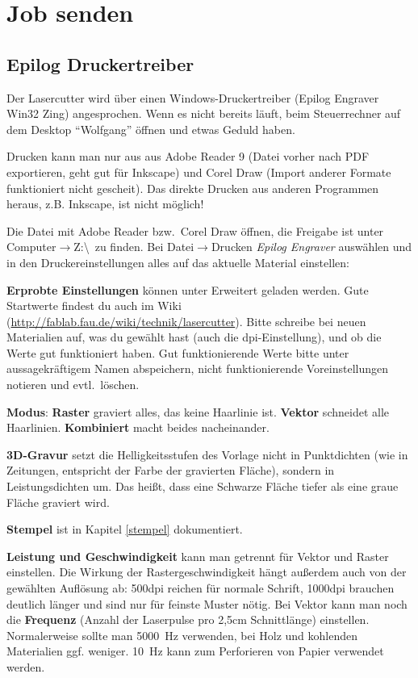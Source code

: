 \documentclass{\basedir/fablab-document}
\begin{document}
\section{Job senden}
\subsection{Epilog Druckertreiber}

Der Lasercutter wird über einen Windows-Druckertreiber (Epilog Engraver Win32 Zing) angesprochen. Wenn es nicht bereits läuft, beim Steuerrechner auf dem Desktop \enquote{Wolfgang} %
 öffnen und etwas Geduld haben. 

Drucken kann man nur aus aus Adobe Reader 9 (Datei vorher nach PDF exportieren, geht gut für Inkscape) und Corel Draw (Import anderer Formate funktioniert nicht gescheit).  Das direkte Drucken aus anderen Programmen heraus, z.B. Inkscape, ist nicht möglich! 

Die Datei mit Adobe Reader bzw.\  Corel Draw öffnen, die Freigabe ist unter Computer$\rightarrow$Z:\textbackslash \ zu finden. Bei Datei$\rightarrow$Drucken \textit{Epilog Engraver} auswählen und in den Druckereinstellungen alles auf das aktuelle Material einstellen:

\textbf{Erprobte Einstellungen} können unter Erweitert geladen werden. Gute Startwerte findest du auch im Wiki (\url{http://fablab.fau.de/wiki/technik/lasercutter}). Bitte schreibe bei neuen Materialien auf, was du gewählt hast (auch die dpi-Einstellung), und ob die Werte gut funktioniert haben. Gut funktionierende Werte bitte unter aussagekräftigem Namen abspeichern, nicht funktionierende Voreinstellungen notieren und evtl.\  löschen.

\textbf{Modus}: \textbf{Raster} graviert alles, das keine Haarlinie ist. \textbf{Vektor} schneidet alle Haarlinien. \textbf{Kombiniert} macht beides nacheinander.

\textbf{3D-Gravur} setzt die Helligkeitsstufen des Vorlage nicht in Punktdichten (wie in Zeitungen, entspricht der Farbe der gravierten Fläche), sondern in Leistungsdichten um. Das heißt, dass eine Schwarze Fläche tiefer als eine graue Fläche graviert wird.

\textbf{Stempel} ist in Kapitel \ref{stempel} dokumentiert.

\textbf{Leistung und Geschwindigkeit} kann man getrennt für Vektor und Raster einstellen. Die Wirkung der Rastergeschwindigkeit hängt außerdem auch von der gewählten Auflösung ab: 500dpi reichen für normale Schrift, 1000dpi brauchen deutlich länger und sind nur für feinste Muster nötig. Bei Vektor kann man noch die \textbf{Frequenz} (Anzahl der Laserpulse pro 2,5cm Schnittlänge) einstellen. Normalerweise sollte man 5000~Hz verwenden, bei Holz und kohlenden Materialien ggf. weniger. 10~Hz kann zum Perforieren von Papier verwendet werden. %
\end{document}
